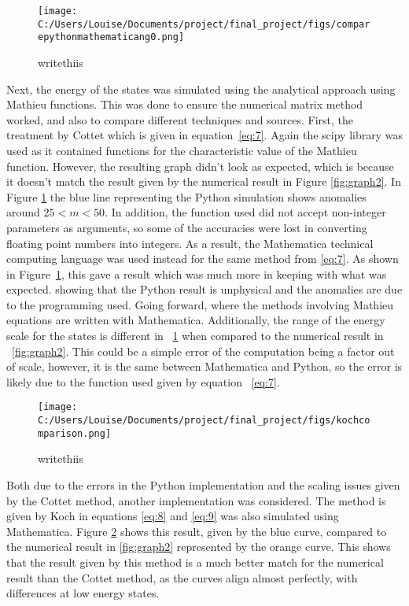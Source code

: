\documentclass[11pt]{article}
\begin{document}
\begin{figure}[ht]
\centering
\texttt{[image: C:/Users/Louise/Documents/project/final\_project/figs/comparepythonmathematicang0.png]}
\caption{writethiis}
\label{fig:graph3}
\end{figure}
Next, the energy of the states was simulated using the analytical approach using Mathieu functions. This was done to ensure the numerical matrix method worked, and also to compare different techniques and sources. First, the treatment by Cottet which is given in equation~\ref{eq:7}. Again the scipy library was used as it contained functions for the characteristic value of the Mathieu function. However, the resulting graph didn't look as expected, which is because it doesn't match the result given by the numerical result in Figure \ref{fig:graph2}. In Figure \ref{fig:graph3} the blue line representing the Python simulation shows anomalies around $25 < m < 50$. In addition, the function used did not accept non-integer parameters as arguments, so some of the accuracies were lost in converting floating point numbers into integers. As a result, the Mathematica technical computing language was used instead for the same method from \ref{eq:7}. As shown in Figure~\ref{fig:graph3}, this gave a result which was much more in keeping with what was expected. showing that the Python result is unphysical and the anomalies are due to the programming used. Going forward, where the methods involving Mathieu equations are written with Mathematica.
Additionally, the range of the energy scale for the states is different in ~\ref{fig:graph3} when compared to the numerical result in ~\ref{fig:graph2}. This could be a simple error of the computation being a factor out of scale, however, it is the same between Mathematica and Python, so the error is likely due to the function used given by equation  ~\ref{eq:7}.
\begin{figure}[ht]
\centering
\texttt{[image: C:/Users/Louise/Documents/project/final\_project/figs/kochcomparison.png]}
\caption{writethiis}
\label{fig:graph4}
\end{figure}
Both due to the errors in the Python implementation and the scaling issues given by the Cottet method, another implementation was considered. The method is given by Koch in equations \ref{eq:8} and \ref{eq:9} was also simulated using Mathematica. Figure \ref{fig:graph4} shows this result, given by the blue curve, compared to the numerical result in \ref{fig:graph2} represented by the orange curve. This shows that the result given by this method is a much better match for the numerical result than the Cottet method, as the curves align almost perfectly, with differences at low energy states.
\end{document}
